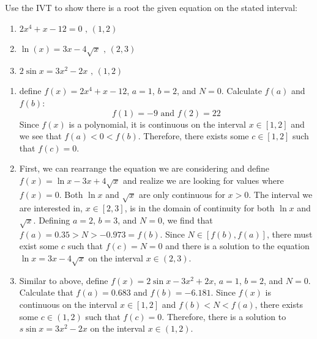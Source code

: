 \begin{Exercise}
    [title=Intermediate Value Theorem Practice, label=IVTPrac]
    Use the IVT to show there is a root the given equation on the stated interval:\
    \begin{enumerate}
        \item $2x^4+x-12=0 \text{ , } \left(1, 2\right)$
        \item $\ln(x)=3x-4\sqrt{x}\text{ , } \left(2, 3\right)$
        \item $2\sin{x} = 3x^2-2x\text{ , } \left(1, 2\right)$
    \end{enumerate}
\end{Exercise}
\begin{Answer}
    [ref=IVTPrac]
    \begin{enumerate}
        \item define $f(x)=2x^4+x-12$, $a=1$, $b=2$, and $N=0$. Calculate $f(a)$ and $f(b)$:
        $$f(1)=-9 \text{ and } f(2)=22$$ Since $f(x)$ is a polynomial, it is continuous on the interval $x\in\left[1, 2\right]$ and we see that $f(a) < 0 < f(b)$. Therefore, there exists some $c \in \left[1, 2\right]$ such that $f(c)=0$.\
        \item First, we can rearrange the equation we are considering and define $f(x)=\ln{x}-3x+4\sqrt{x}$ and realize we are looking for values where $f(x)=0$. Both $\ln{x}$ and $\sqrt{x}$ are only continuous for $x>0$. The interval we are interested in, $x \in \left[2, 3\right]$, is in the domain of continuity for both $\ln{x}$ and $\sqrt{x}$. Defining $a=2$, $b=3$, and $N=0$, we find that $f(a) = 0.35 > N > -0.973 = f(b)$. Since $N \in \left[f(b), f(a)\right]$, there must exist some $c$ such that $f(c)=N=0$ and there is a solution to the equation $\ln{x} = 3x-4\sqrt{x}$ on the interval $x \in \left(2, 3\right)$.
        \item Similar to above, define $f(x) = 2\sin{x}-3x^2+2x$, $a=1$, $b=2$, and $N=0$. Calculate that $f(a) = 0.683$ and $f(b) = -6.181$. Since $f(x)$ is continuous on the interval $ x \in \left[1, 2\right]$ and $f(b) < N < f(a)$, there exists some $c \in \left(1, 2 \right)$ such that $f(c) = 0$. Therefore, there is a solution to $s\sin{x} = 3x^2-2x$ on the interval $ x\in \left(1, 2\right)$.
    \end{enumerate}
\end{Answer}

